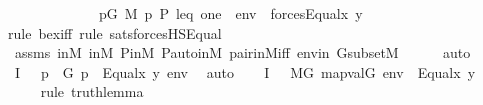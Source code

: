 \begin{isabellebody}
\ \ \ \ \ \ \ \ \ \ \ \ \ {\isacharparenleft}{\kern0pt}{\isasymexists}p{\isasymin}G{\isachardot}{\kern0pt}\ M{\isacharcomma}{\kern0pt}\ {\isacharbrackleft}{\kern0pt}p{\isacharcomma}{\kern0pt}\ P{\isacharcomma}{\kern0pt}\ leq{\isacharcomma}{\kern0pt}\ one{\isacharbrackright}{\kern0pt}\ {\isacharat}{\kern0pt}\ env\ {\isasymTurnstile}\ forces{\isacharparenleft}{\kern0pt}Equal{\isacharparenleft}{\kern0pt}x{\isacharcomma}{\kern0pt}\ y{\isacharparenright}{\kern0pt}{\isacharparenright}{\kern0pt}{\isacharparenright}{\kern0pt}{\isachardoublequoteclose}\ \isanewline
\ \ \ \ \isamarkupfalse%
{\isacharparenleft}{\kern0pt}rule\ bex{\isacharunderscore}{\kern0pt}iff{\isacharcomma}{\kern0pt}\ rule\ sats{\isacharunderscore}{\kern0pt}forcesHS{\isacharunderscore}{\kern0pt}Equal{\isacharparenright}{\kern0pt}\isanewline
\ \ \ \ \isamarkupfalse%
\ assms{}\ {\isasymF}{\isacharunderscore}{\kern0pt}in{\isacharunderscore}{\kern0pt}M\ {\isasymG}{\isacharunderscore}{\kern0pt}in{\isacharunderscore}{\kern0pt}M\ P{\isacharunderscore}{\kern0pt}in{\isacharunderscore}{\kern0pt}M\ P{\isacharunderscore}{\kern0pt}auto{\isacharunderscore}{\kern0pt}in{\isacharunderscore}{\kern0pt}M\ pair{\isacharunderscore}{\kern0pt}in{\isacharunderscore}{\kern0pt}M{\isacharunderscore}{\kern0pt}iff\ envin\ GsubsetM\isanewline
\ \ \ \ \isamarkupfalse%
\ auto\isanewline
\ \ \isamarkupfalse%
\ I{}{\isacharcolon}{\kern0pt}\ {\isachardoublequoteopen}{\isachardot}{\kern0pt}{\isachardot}{\kern0pt}{\isachardot}{\kern0pt}\ {\isasymlongleftrightarrow}\ {\isacharparenleft}{\kern0pt}{\isasymexists}p\ {\isasymin}\ G{\isachardot}{\kern0pt}\ p\ {\isasymtturnstile}\ Equal{\isacharparenleft}{\kern0pt}x{\isacharcomma}{\kern0pt}\ y{\isacharparenright}{\kern0pt}\ env{\isacharparenright}{\kern0pt}{\isachardoublequoteclose}\ \isamarkupfalse%
\ auto\isanewline
\ \ \isamarkupfalse%
\ I{}{\isacharcolon}{\kern0pt}\ {\isachardoublequoteopen}{\isachardot}{\kern0pt}{\isachardot}{\kern0pt}{\isachardot}{\kern0pt}\ {\isasymlongleftrightarrow}\ M{\isacharbrackleft}{\kern0pt}G{\isacharbrackright}{\kern0pt}{\isacharcomma}{\kern0pt}\ map{\isacharparenleft}{\kern0pt}val{\isacharparenleft}{\kern0pt}G{\isacharparenright}{\kern0pt}{\isacharcomma}{\kern0pt}\ env{\isacharparenright}{\kern0pt}\ {\isasymTurnstile}\ Equal{\isacharparenleft}{\kern0pt}x{\isacharcomma}{\kern0pt}\ y{\isacharparenright}{\kern0pt}{\isachardoublequoteclose}\ \isanewline
\ \ \ \ \isamarkupfalse%
{\isacharparenleft}{\kern0pt}rule\ truth{\isacharunderscore}{\kern0pt}lemma{\isacharparenright}{\kern0pt}\isanewline

\end{isabellebody}
